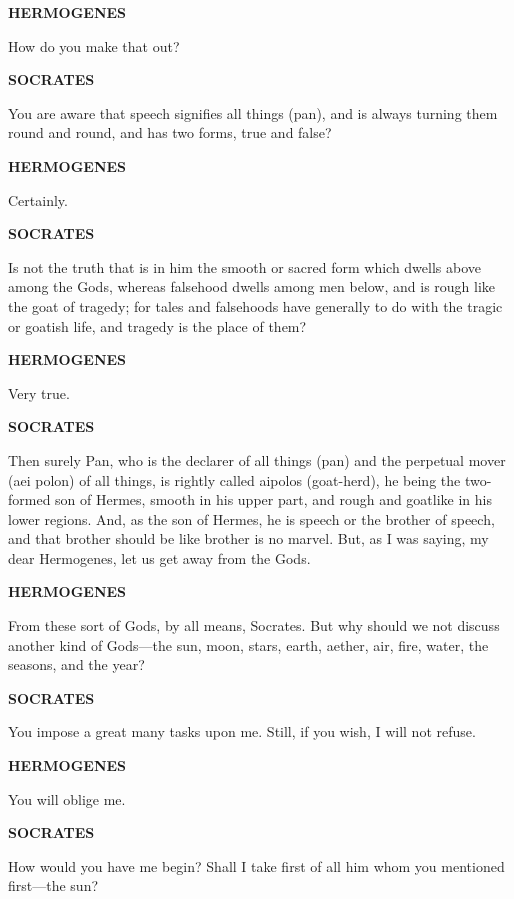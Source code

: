 \documentclass[11pt,letter]{article}
\begin{document}
\par \textbf{HERMOGENES}
\par   How do you make that out?

\par \textbf{SOCRATES}
\par   You are aware that speech signifies all things (pan), and is always turning them round and round, and has two forms, true and false?

\par \textbf{HERMOGENES}
\par   Certainly.

\par \textbf{SOCRATES}
\par   Is not the truth that is in him the smooth or sacred form which dwells above among the Gods, whereas falsehood dwells among men below, and is rough like the goat of tragedy; for tales and falsehoods have generally to do with the tragic or goatish life, and tragedy is the place of them?

\par \textbf{HERMOGENES}
\par   Very true.

\par \textbf{SOCRATES}
\par   Then surely Pan, who is the declarer of all things (pan) and the perpetual mover (aei polon) of all things, is rightly called aipolos (goat-herd), he being the two-formed son of Hermes, smooth in his upper part, and rough and goatlike in his lower regions. And, as the son of Hermes, he is speech or the brother of speech, and that brother should be like brother is no marvel. But, as I was saying, my dear Hermogenes, let us get away from the Gods.

\par \textbf{HERMOGENES}
\par   From these sort of Gods, by all means, Socrates. But why should we not discuss another kind of Gods—the sun, moon, stars, earth, aether, air, fire, water, the seasons, and the year?

\par \textbf{SOCRATES}
\par   You impose a great many tasks upon me. Still, if you wish, I will not refuse.

\par \textbf{HERMOGENES}
\par   You will oblige me.

\par \textbf{SOCRATES}
\par   How would you have me begin? Shall I take first of all him whom you mentioned first—the sun?
\end{document}
